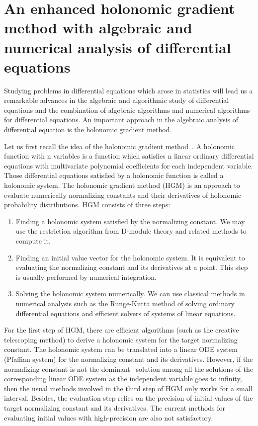 \documentclass[10pt,a4paper]{article}
\begin{document}
\section{An enhanced holonomic gradient method with algebraic and numerical analysis of differential equations} \label{SECT:HGM}


Studying problems in differential equations which arose in statistics will lead us a remarkable advances in the algebraic and algorithmic study of differential equations and the combination of algebraic algorithms and numerical algorithms for differential equations. An important approach in the algebraic analysis of differential equation is the holonomic gradient method. 

  Let us first recall the idea of the holonomic gradient method~\cite{Nakayama2011}. A holonomic function with n variables is a function which satisfies n linear ordinary differential equations with multivariate polynomial coefficients for each independent variable. Those differential equations satisfied by a holonomic function is called a holonomic system. The holonomic gradient method (HGM) is an approach to evaluate numerically normalizing constants and their derivatives of holonomic probability distributions. HGM consists of three steps: 
\begin{enumerate}
  \item Finding a holonomic system satisfied by the normalizing constant. We may use the restriction algorithm from D-module theory and related methods to compute it. 
  \item Finding an initial value vector for the holonomic system. It is equivalent to evaluating the normalizing constant and its derivatives at a point. This step is usually performed by numerical integration.
  \item Solving the holonomic system numerically. We can use classical methods in numerical analysis such as the Runge-Kutta method of solving ordinary differential equations and efficient solvers of systems of linear equations.
  \end{enumerate}

For the first step of HGM, there are efficient algorithms (such as the creative telescoping method) to derive a holonomic system for the target normalizing constant. The holonomic system can be translated into a linear ODE system (Pfaffian system) for the normalizing constant and its derivatives. However, if the normalizing constant is not the dominant~\cite{Danufane2018} solution among all the solutions of the corresponding linear ODE system as the independent variable goes to infinity, then the usual methods involved in the third step of HGM only works for a small interval. Besides, the evaluation step relies on the precision of initial values of the target normalizing constant and its derivatives. The current methods for evaluating initial values with high-precision are also not satisfactory.
  
\end{document}
